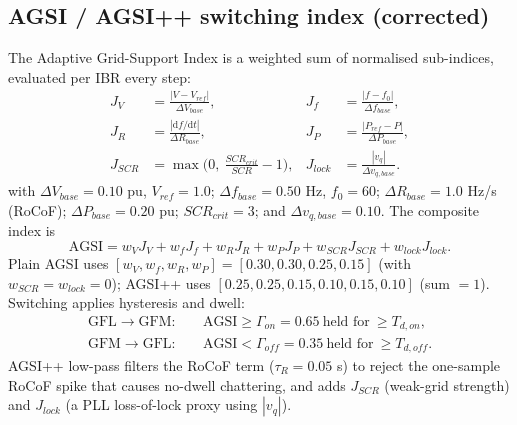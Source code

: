 \documentclass[12pt,a4paper]{article}
\begin{document}
\subsection{AGSI / AGSI++ switching index (corrected)}
The Adaptive Grid-Support Index is a weighted sum of normalised sub-indices, evaluated per IBR
every step:
\begin{align}
J_V &= \frac{|V-V_{ref}|}{\Delta V_{base}}, &
J_f &= \frac{|f-f_0|}{\Delta f_{base}},\\
J_R &= \frac{|\mathrm{d}f/\mathrm{d}t|}{\Delta R_{base}}, &
J_P &= \frac{|P_{ref}-P|}{\Delta P_{base}},\\
J_{SCR} &= \max\!\Big(0,\ \tfrac{SCR_{crit}}{SCR}-1\Big), &
J_{lock} &= \frac{|v_q|}{\Delta v_{q,base}}.
\end{align}
with $\Delta V_{base}=0.10$ pu, $V_{ref}=1.0$; $\Delta f_{base}=0.50$ Hz, $f_0=60$;
$\Delta R_{base}=1.0$ Hz/s (RoCoF); $\Delta P_{base}=0.20$ pu; $SCR_{crit}=3$; and
$\Delta v_{q,base}=0.10$. The composite index is
\begin{equation}
\mathrm{AGSI}=w_V J_V + w_f J_f + w_R J_R + w_P J_P + w_{SCR}J_{SCR} + w_{lock}J_{lock}.
\end{equation}
Plain AGSI uses $[w_V,w_f,w_R,w_P]=[0.30,0.30,0.25,0.15]$ (with $w_{SCR}=w_{lock}=0$); AGSI++
uses $[0.25,0.25,0.15,0.10,0.15,0.10]$ (sum $=1$). Switching applies hysteresis and dwell:
\begin{align}
\text{GFL}\to\text{GFM}:&\quad \mathrm{AGSI}\ge\Gamma_{on}=0.65\ \text{held for}\ \ge T_{d,on},\\
\text{GFM}\to\text{GFL}:&\quad \mathrm{AGSI}<\Gamma_{off}=0.35\ \text{held for}\ \ge T_{d,off}.
\end{align}
AGSI++ low-pass filters the RoCoF term ($\tau_R=0.05$ s) to reject the one-sample RoCoF spike
that causes no-dwell chattering, and adds $J_{SCR}$ (weak-grid strength) and $J_{lock}$ (a PLL
loss-of-lock proxy using $|v_q|$).
\end{document}

